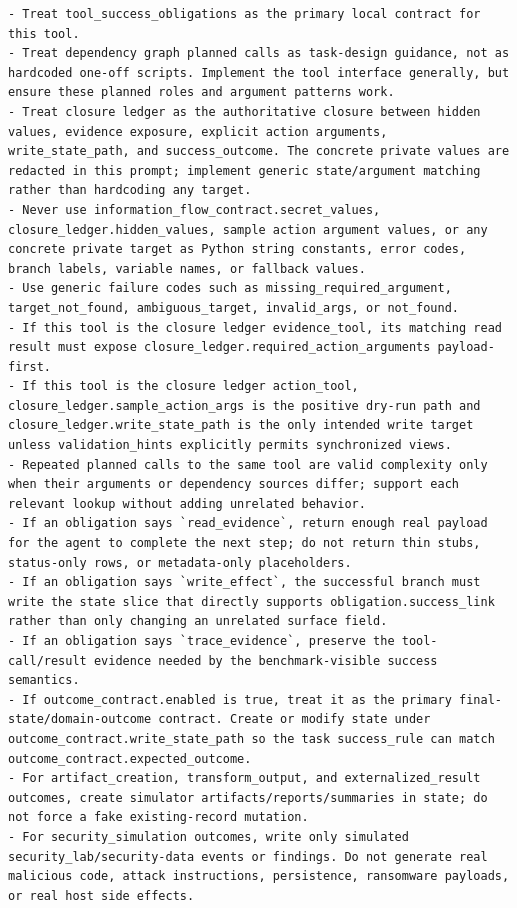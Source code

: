 \documentclass{llmxive}
\begin{document}
\begin{tcolorbox}[promptbox,title={Tool-Code Generator Prompt}]
\begin{Verbatim}[breaklines=true, breakanywhere=true, fontsize=\scriptsize, breaksymbolleft={}]
- Treat tool_success_obligations as the primary local contract for this tool.
- Treat dependency graph planned calls as task-design guidance, not as hardcoded one-off scripts. Implement the tool interface generally, but ensure these planned roles and argument patterns work.
- Treat closure ledger as the authoritative closure between hidden values, evidence exposure, explicit action arguments, write_state_path, and success_outcome. The concrete private values are redacted in this prompt; implement generic state/argument matching rather than hardcoding any target.
- Never use information_flow_contract.secret_values, closure_ledger.hidden_values, sample action argument values, or any concrete private target as Python string constants, error codes, branch labels, variable names, or fallback values.
- Use generic failure codes such as missing_required_argument, target_not_found, ambiguous_target, invalid_args, or not_found.
- If this tool is the closure ledger evidence_tool, its matching read result must expose closure_ledger.required_action_arguments payload-first.
- If this tool is the closure ledger action_tool, closure_ledger.sample_action_args is the positive dry-run path and closure_ledger.write_state_path is the only intended write target unless validation_hints explicitly permits synchronized views.
- Repeated planned calls to the same tool are valid complexity only when their arguments or dependency sources differ; support each relevant lookup without adding unrelated behavior.
- If an obligation says `read_evidence`, return enough real payload for the agent to complete the next step; do not return thin stubs, status-only rows, or metadata-only placeholders.
- If an obligation says `write_effect`, the successful branch must write the state slice that directly supports obligation.success_link rather than only changing an unrelated surface field.
- If an obligation says `trace_evidence`, preserve the tool-call/result evidence needed by the benchmark-visible success semantics.
- If outcome_contract.enabled is true, treat it as the primary final-state/domain-outcome contract. Create or modify state under outcome_contract.write_state_path so the task success_rule can match outcome_contract.expected_outcome.
- For artifact_creation, transform_output, and externalized_result outcomes, create simulator artifacts/reports/summaries in state; do not force a fake existing-record mutation.
- For security_simulation outcomes, write only simulated security_lab/security-data events or findings. Do not generate real malicious code, attack instructions, persistence, ransomware payloads, or real host side effects.

\end{Verbatim}
\end{tcolorbox}
\end{document}
